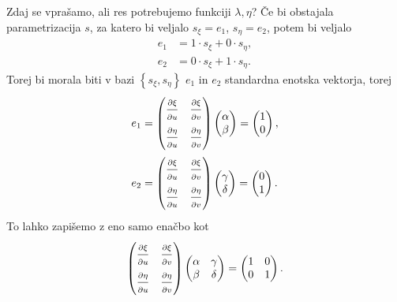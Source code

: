Zdaj se vprašamo, ali res potrebujemo funkciji $\lambda, \eta$? Če bi obstajala parametrizacija $s$, za katero bi veljalo $s_{\xi} = e_1$, $s_{\eta} = e_2$, potem bi veljalo 
\begin{align*}
    e_1 &= 1 \cdot s_{\xi} + 0 \cdot s_{\eta},  \\
    e_2 &= 0 \cdot s_{\xi} + 1 \cdot s_{\eta}.
\end{align*}
Torej bi morala biti v bazi $\left\{ s_{\xi}, s_{\eta} \right\}$ $e_1$ in $e_2$ standardna enotska vektorja, torej
\begin{align*}
  e_1 &=  \begin{pmatrix}
    \frac{ \strut\partial \xi }{ \strut\partial u }  & \frac{ \strut\partial \xi }{ \strut\partial v }  \\
    \frac{ \strut\partial \eta }{ \strut\partial u }  & \frac{ \strut\partial \eta }{ \strut\partial v } 
    \end{pmatrix} \begin{pmatrix}
  \alpha \\ \beta 
  \end{pmatrix}  = \begin{pmatrix}
    1 \\ 0 
    \end{pmatrix},   \\
  e_2 &= \begin{pmatrix}
    \frac{ \strut\partial \xi }{ \strut\partial u }  & \frac{ \strut\partial \xi }{ \strut\partial v }  \\
    \frac{ \strut\partial \eta }{ \strut\partial u }  & \frac{ \strut\partial \eta }{ \strut\partial v } 
    \end{pmatrix} \begin{pmatrix}
    \gamma \\ \delta 
    \end{pmatrix}  = \begin{pmatrix}
      0 \\ 1 
      \end{pmatrix}.
\end{align*}
To lahko zapišemo z eno samo enačbo kot \begin{equation*}
  \begin{pmatrix}
    \frac{ \strut\partial \xi }{ \strut\partial u }  & \frac{ \strut\partial \xi }{ \strut\partial v }  \\
    \frac{ \strut\partial \eta }{ \strut\partial u }  & \frac{ \strut\partial \eta }{ \strut\partial v } 
    \end{pmatrix} \begin{pmatrix}
      \alpha & \gamma \\ \beta & \delta
      \end{pmatrix} = \begin{pmatrix}
        1 & 0  \\ 0 & 1 
        \end{pmatrix}.
\end{equation*}  
